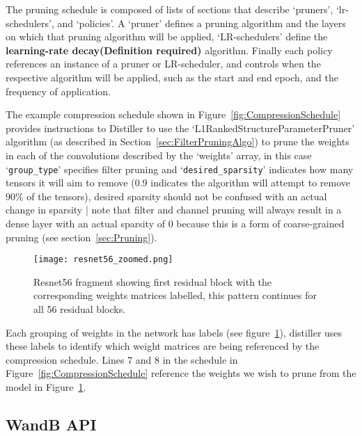 \documentclass[../Dissertation.tex]{subfiles}
\begin{document}
The pruning schedule is composed of lists of sections that describe `{\color{mintedgreen}pruners}', `{\color{mintedgreen}lr-schedulers}', and `{\color{mintedgreen}policies}'. 
A `{\color{mintedgreen}pruner}' defines a pruning algorithm and the layers on which that pruning algorithm will be applied, `LR-schedulers' define the \textbf{learning-rate decay(\color{red}Definition required)} algorithm. 
Finally each policy references an instance of a pruner or LR-scheduler, and controls when the respective algorithm will be applied, such as the start and end epoch, and the frequency of application.

The example compression schedule shown in Figure~\ref{fig:CompressionSchedule} provides instructions to Distiller to use the `L1RankedStructureParameterPruner' algorithm (as described in Section~\ref{sec:FilterPruningAlgo}) to prune the weights in each of the convolutions described by the `weights' array, in this case `\texttt{\color{mintedgreen}group\_type}' specifies filter pruning and `\texttt{\color{mintedgreen}desired\_sparsity}' indicates how many tensors it will aim to remove (0.9 indicates the algorithm will attempt to remove 90\% of the tensors), desired sparsity should not be confused with an actual change in sparsity | note that filter and channel pruning will always result in a dense layer with an actual sparsity of 0 because this is a form of coarse-grained pruning (see section~\ref{sec:Pruning}).

\begin{figure}[H]
    \texttt{[image: resnet56\_zoomed.png]}
    \caption{Resnet56 fragment showing first residual block with the corresponding weights matrices labelled, this pattern continues for all 56 residual blocks.}
    \label{fig:resnet56weightlabels}
\end{figure}

Each grouping of weights in the network has labels (see figure~\ref{fig:resnet56weightlabels}), distiller uses these labels to identify which weight matrices are being referenced by the compression schedule. 
Lines 7 and 8 in the schedule in Figure~\ref{fig:CompressionSchedule} reference the weights we wish to prune from the model in Figure~\ref{fig:resnet56weightlabels}.


\newpage
\subsection{WandB API}
\end{document}
